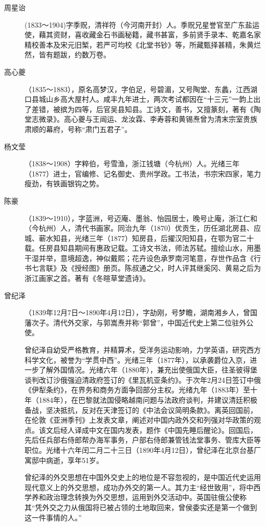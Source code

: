 \begin{description}
  \item[周星诒] (1833～1904)字季贶，清祥符（今河南开封）人。季贶兄星誉官至广东盐运使，藉其资财，喜收藏金石书画秘籍，藏书甚富，多前贤手录本、乾嘉名家精校善本及宋元旧椠，若严可均校《北堂书钞》等，所藏甄择甚精，朱黄烂然，皆有题跋，约数万卷。
  \item[高心夔] （1835～1883），原名高梦汉，字伯足，号碧湄，又号陶堂、东蠡，江西湖口县城山乡高大屋村人。咸丰九年进士，两次考试都因在“十三元”一韵上出了差错，被摈为四等，后官吴县知县。工诗文，善书，又擅篆刻，著有《陶堂志微录》。高心夔与王闿运、龙汝霖、李寿蓉和黄锡焘曾为清末宗室贵族肃顺的幕府，号称“肃门五君子”。
  \item[杨文莹] （1838～1908）字粹伯，号雪渔，浙江钱塘（今杭州）人。光绪三年（1877）进士，官编修、记名御史、贵州学政。工书法，书宗宋四家，笔力瘦劲，有铁画银钩之势。
  \item[陈豪] （1839～1910），字蓝洲，号迈庵、墨翁、怡园居士，晚号止庵，浙江仁和（今杭州）人，清代书画家。同治九年（1870）优贡生，历任湖北房县、应城、蕲水知县，光绪三年（1877）知房县，后擢汉阳知县，在鄂为官二十载。任房县知县期间有惠政记载。工诗文书法，师法苏轼。擅绘山水，用墨干湿并举，意境超逸，神似戴熙；花卉设色承罗南河笔意，存世作品含《行书七言联》及《授经图》册页。陈叔通之父，时人评其继奚冈、黄易之后为浙江画家之首。著有《冬暄草堂遗诗》。
  \item[曾纪泽] （1839年12月7日～1890年4月12日），字劼刚，号梦瞻，湖南湘乡人，曾国藩次子。清代外交家，与郭嵩焘并称“郭曾”，中国近代史上第二位驻外公使。\par
        曾纪泽自幼受严格教育，并精算术，受洋务运动影响，力学英语，研究西方科学文化，被誉为“学贯中西”。光绪三年（1877年），以承袭爵位入京，进一步了解外国情况。光绪六年（1880年），兼充出使俄国大臣，往圣彼得堡谈判改订沙俄强迫清政府签订的《里瓦机亚条约》。于次年2月24日签订中俄《伊犁条约》，在界务和商务方面争回部分主权。光绪九年（1883年）至十年（1884年），在巴黎就法国侵略越南问题与法政府谈判，并建议清廷积极备战，坚决抵抗，反对在天津签订的《中法会议简明条款》。离英回国前，在伦敦《亚洲季刊》上发表文章，阐述对中国内政外交和列强对华政策的观点。该文后经人译成中文在国内发表，题作《中国先睡后醒论》。回国后，先后任兵部右侍郎帮办海军事务，户部右侍郎兼管钱法堂事务、管库大臣等职位。光绪十六年闰二月二十三日（1890年4月12日），曾纪泽在北京台基厂寓邸中病逝，享年51岁。\par
        曾纪泽的外交思想在中国外交史上的地位是不容忽视的，是中国近代史运用现代意义上的外交思想，成功办外交的第一人。其力主“经世致用”，将中西学养和政治理念转换为外交思想，运用到外交活动中。英国驻俄公使称其“凭外交之力从俄国将已被占领的土地取回来，曾侯委实还是第一个做到这一件事情的人。”

\end{description}
